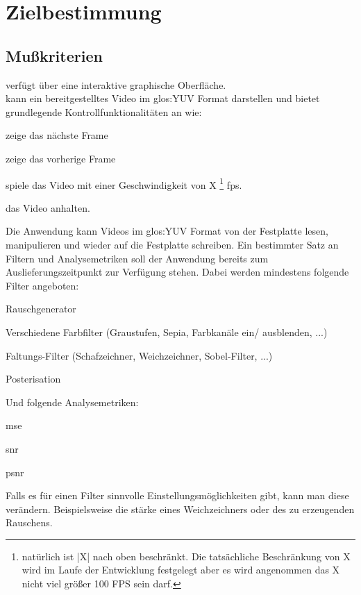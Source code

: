 \chapter{Zielbestimmung}

\section{Mußkriterien}
\setcounter{counterKriterien}{0}
 \projektTitel verfügt über eine interaktive graphische Oberfläche.\\
 \projektTitel kann ein bereitgestelltes Video im \gls{glos:YUV} Format darstellen und bietet grundlegende Kontrollfunktionalitäten an wie:
\begin{compactitem}
\item zeige das nächste Frame
\item zeige das vorherige Frame
\item spiele das Video mit einer Geschwindigkeit von X \footnote{ natürlich ist |X| nach oben beschränkt. Die tatsächliche Beschränkung von X wird im Laufe der Entwicklung festgelegt aber es wird angenommen das X nicht viel größer 100 FPS sein darf.} \gls{fps}.
\item das Video anhalten.
\end{compactitem} 
 Die Anwendung kann Videos im \gls{glos:YUV} Format von der Festplatte lesen, manipulieren und wieder auf die Festplatte schreiben.
 Ein bestimmter Satz an Filtern und Analysemetriken soll der Anwendung bereits zum Auslieferungszeitpunkt zur Verfügung stehen. 
Dabei werden mindestens folgende Filter angeboten:
\begin{compactitem}
\item Rauschgenerator
\item Verschiedene Farbfilter (Graustufen, Sepia, Farbkanäle ein/ ausblenden, ...)
\item Faltungs-Filter (Schafzeichner, Weichzeichner, Sobel-Filter, ...)
\item Posterisation
\end{compactitem}
Und folgende Analysemetriken:
\begin{compactitem}
\item \gls{mse}
\item \gls{snr}
\item \gls{psnr}
\end{compactitem}
 Falls es für einen Filter sinnvolle Einstellungsmöglichkeiten gibt, kann man diese verändern. Beispielsweise die stärke eines Weichzeichners oder des zu erzeugenden Rauschens.\\
